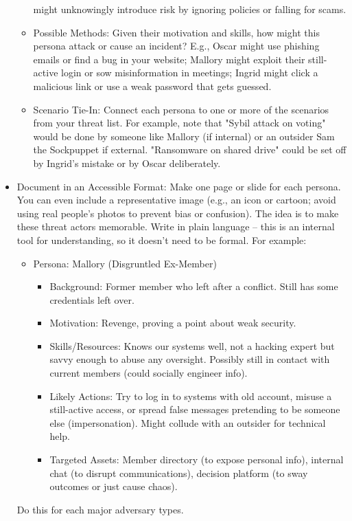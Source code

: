 \begin{itemize}
\begin{itemize}
            might unknowingly introduce risk by ignoring policies or falling for scams.
            \item Possible Methods: Given their motivation and skills, how might this persona attack or cause an
            incident? E.g., Oscar might use phishing emails or find a bug in your website; Mallory might exploit their
            still-active login or sow misinformation in meetings; Ingrid might click a malicious link or use a weak password
            that gets guessed.
            \item Scenario Tie-In: Connect each persona to one or more of the scenarios from your threat list. For
            example, note that "Sybil attack on voting" would be done by someone like Mallory (if internal) or an outsider
            Sam the Sockpuppet if external. "Ransomware on shared drive" could be set off by Ingrid's mistake or by Oscar
            deliberately.
        \end{itemize}
    \item Document in an Accessible Format: Make one page or slide for each persona. You can even include a
    representative image (e.g., an icon or cartoon; avoid using real people's photos to prevent bias or confusion).
    The idea is to make these threat actors memorable. Write in plain language – this is an internal tool for
    understanding, so it doesn't need to be formal. For example:
    \begin{itemize}   
        \item Persona: Mallory (Disgruntled Ex-Member)
            \begin{itemize}    
                \item Background: Former member who left after a conflict. Still has some credentials left over.
                \item Motivation: Revenge, proving a point about weak security.
                \item Skills/Resources: Knows our systems well, not a hacking expert but savvy enough to abuse any
                oversight. Possibly still in contact with current members (could socially engineer info).
                \item Likely Actions: Try to log in to systems with old account, misuse a still-active access, or spread
                false messages pretending to be someone else (impersonation). Might collude with an outsider for technical help.
                \item Targeted Assets: Member directory (to expose personal info), internal chat (to disrupt
                communications), decision platform (to sway outcomes or just cause chaos).
            \end{itemize}
        \end{itemize}
        Do this for each major adversary types.
    

\end{itemize}
